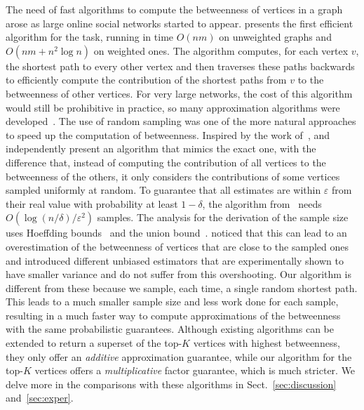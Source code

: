The need of fast algorithms to compute the betweenness of vertices in a graph
arose as large online social networks started to appear. \citet{Brandes01} presents the
first efficient algorithm for the task, running in time $O(nm)$ on
unweighted graphs and $O(nm+n^2\log n)$ on weighted ones. The
algorithm computes, for each vertex $v$, the shortest path to every other vertex
and then traverses these paths backwards to efficiently compute the contribution
of the shortest paths from $v$ to the betweenness of other vertices. For very
large networks, the cost of this algorithm would still be prohibitive in
practice, so many approximation algorithms were
developed~\citep{JacobKLPT05,BrandesP07,BaderKMM07,GeisbergerSS08,MaiyaBW10,LimMRTB11}.
The use of random sampling was one of the more natural approaches to speed up
the computation of betweenness. Inspired by the work of~\citet{EppsteinW04},
\citet{JacobKLPT05} and independently \citet{BrandesP07} present an algorithm
that mimics the exact one, with the difference that,
instead of computing the contribution of all vertices to the betweenness of the
others, it only considers the contributions of some vertices sampled uniformly
at random. To guarantee that all estimates are within $\varepsilon$ from their
real value with probability at least $1-\delta$, the algorithm
from~\citep{JacobKLPT05,BrandesP07} needs $O(\log(n/\delta)/\varepsilon^2)$
samples. The analysis for the derivation of the sample size uses Hoeffding bounds~\citep{Hoeffding63} 
and the union bound~\citep{MitzenmacherU05}. 
\citet{GeisbergerSS08} noticed that this can lead
to an overestimation of the betweenness of vertices that are close to the
sampled ones and introduced different unbiased estimators that are
experimentally shown to have smaller variance and do not suffer from this
overshooting. Our algorithm is different from these because we sample, each
time, a single random shortest path. %
This leads to a much smaller sample size and less work done for each sample,
resulting in a much faster way to compute approximations of the betweenness with
the same probabilistic guarantees. 
\ifproof
Although existing algorithms \citep{BrandesP07,JacobKLPT05,GeisbergerSS08} can be extended to return a
superset of the top-$K$ vertices with highest betweenness, they only offer an
\emph{additive} approximation guarantee, while our algorithm for the top-$K$
vertices offers a \emph{multiplicative} factor guarantee, which is much
stricter. 
\fi
We delve more in the comparisons with these algorithms in
Sect.~\ref{sec:discussion} and~\ref{sec:exper}. 

